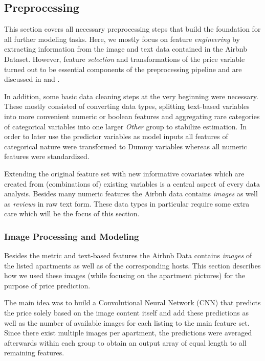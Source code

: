
\subsection{Preprocessing}

This section covers all necessary preprocessing steps that build the foundation for all further modeling tasks.
Here, we mostly focus on feature \emph{engineering} by extracting information from the image and text data contained in the Airbnb Dataset.
However, feature \emph{selection} and transformations of the price variable turned out to be essential components of the preprocessing pipeline and are discussed in  and .

In addition, some basic data cleaning steps at the very beginning were necessary.
These mostly consisted of converting data types, splitting text-based variables into more convenient numeric or boolean features and aggregating rare categories of categorical variables into one larger \emph{Other} group to stabilize estimation.
In order to later use the predictor variables as model inputs all features of categorical nature were transformed to Dummy variables whereas all numeric features were standardized.

Extending the original feature set with new informative covariates which are created from (combinations of) existing variables is a central aspect of every data analysis.
Besides many numeric features the Airbnb data contains \emph{images} as well as \emph{reviews} in raw text form.
These data types in particular require some extra care which will be the focus of this section.

\subsubsection{Image Processing and Modeling}

Besides the metric and text-based features the Airbnb Data contains \emph{images} of the listed apartments as well as of the corresponding hosts.
This section describes how we used these images (while focusing on the apartment pictures) for the purpose of price prediction.

The main idea was to build a Convolutional Neural Network (CNN) that predicts the price solely based on the image content itself and add these predictions as well as the number of available images for each listing to the main feature set.
Since there exist multiple images per apartment, the predictions were averaged afterwards within each group to obtain an output array of equal length to all remaining features.

